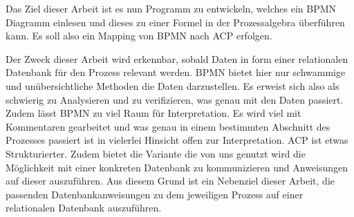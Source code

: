 Das Ziel dieser Arbeit ist es nun Programm zu entwickeln, welches ein BPMN Diagramm einlesen und dieses zu einer Formel in der Prozessalgebra überführen kann. Es soll also ein Mapping von BPMN nach ACP erfolgen. 

Der Zweck dieser Arbeit wird erkennbar, sobald Daten in form einer relationalen Datenbank für den Prozess relevant werden. BPMN bietet hier nur schwammige und unübersichtliche Methoden die Daten darzustellen. Es erweist sich also als schwierig zu Analysieren und zu verifizieren, was genau mit den Daten passiert. Zudem lässt BPMN zu viel Raum für Interpretation. Es wird viel mit Kommentaren gearbeitet und was genau in einem bestimmten Abschnitt des Prozesses passiert ist in vielerlei Hinsicht offen zur Interpretation. ACP ist etwas Strukturierter. Zudem bietet die Variante die von uns genutzt wird die Möglichkeit mit einer konkreten Datenbank zu kommunizieren und Anweisungen auf dieser auszuführen. Aus diesem Grund ist ein Nebenziel dieser Arbeit, die passenden Datenbankanweisungen zu dem jeweiligen Prozess auf einer relationalen Datenbank auszuführen.





